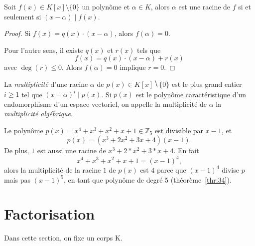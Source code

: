 \begin{theorem}
  \label{thr:35}
  Soit $f(x)∈ K[x] \setminus \{0\}$ un polynôme  et $\alpha \in K$, alors $\alpha$ est une racine de $f$ si et seulement si $(x- \alpha)  \mid f(x)$. 
\end{theorem}

\begin{proof}
  Si $f(x) = q(x) \cdot (x - \alpha)$, alors $f(\alpha) = 0$. 

Pour l'autre sens, il existe $q(x)$ et $r(x)$ tels que
\begin{displaymath}
  f(x) = q(x) \cdot (x - \alpha) + r(x)
\end{displaymath}
avec $\deg(r) \leq 0$. Alors $f(\alpha) = 0$ implique $r=0$. 
\end{proof}


\begin{definition}
  \label{def:41}
  La \emph{multiplicité} d'une racine $α$ de $p(x) ∈ K[x] ⧹\{0\}$ est le plus grand entier $i≥1$ tel que $ (x-α)^i \mid p(x)$. Si $p(x)$ est le polynôme caractéristique d'un endomorphisme d'un espace vectoriel, on appelle la multiplicité de $α$ la \emph{multiplicité algébrique}. 
\end{definition} 


\begin{example}  
  \label{exe:45}
  Le polynôme  $p(x) = x^4 + x^3 + x^2 + x + 1  ∈ℤ_5$  est divisible par $x-1$, et
  \begin{displaymath}
    p(x)  = (x^3 + 2x^2 + 3x + 4)  (x-1). 
  \end{displaymath}
  De plus, $1$ est aussi une racine de $x^3 + 2*x^2 + 3*x + 4$. En fait 
  \begin{displaymath}
    x^4 + x^3 + x^2 + x + 1 = (x-1)^4,
  \end{displaymath}
  alors la multiplicité de la racine $1$ de $p(x)$ est $4$ parce que $(x-1)^4$ divise $p$ mais pas $(x-1)^5$, en tant que polynôme de degré 5 (théorème~\ref{thr:34}).   
\end{example}


\section{Factorisation}
\label{sec:fact-de-polyn}

Dans cette section, on fixe un corps K.

